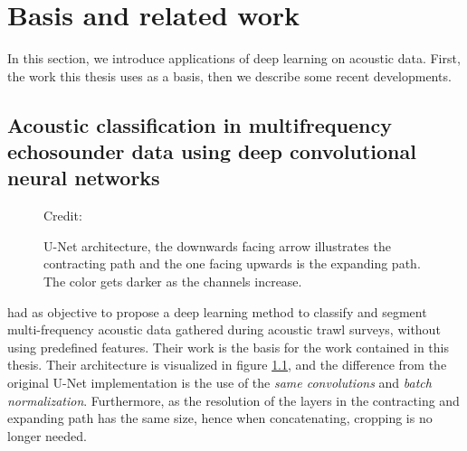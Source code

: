 \chapter{Basis and related work} \label{computer vision}
    In this section, we introduce applications of deep learning on acoustic data. First, the work this thesis uses as a basis, then we describe some recent developments.
    

    


\section{Acoustic classification in multifrequency echosounder data using
deep convolutional neural networks} \label{unet_paper_acoustic}
    
        \begin{figure}[H]
        \centering
        
        \caption[U-Net architecture]{U-Net architecture, the downwards facing arrow illustrates the contracting path and the one facing upwards is the expanding path. The color gets darker as the channels increase.}
      	\medskip 
        \label{unet__brautset_fig}
        \hspace*{15pt}\hbox{\scriptsize Credit: \citeauthor{brautaset2020acoustic}\cite{brautaset2020acoustic}}
    \end{figure}
    
    
    \citeauthor{brautaset2020acoustic}\cite{brautaset2020acoustic} had as objective to propose a deep learning method to classify and segment multi-frequency acoustic data gathered during acoustic trawl surveys, without using predefined features. Their work is the basis for the work contained in this thesis. Their architecture is visualized in figure \ref{unet__brautset_fig}, and the difference from the original U-Net implementation is the use of the \textit{same convolutions} and \textit{batch normalization}. Furthermore, as the resolution of the layers in the contracting and expanding path has the same size, hence when concatenating, cropping is no longer needed.
    
